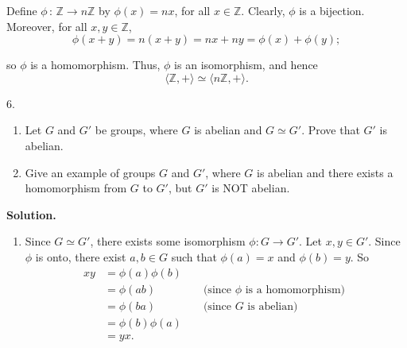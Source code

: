 \documentclass[10pt,]{book}
\theoremstyle{plain}
\theoremstyle{definition}
\theoremstyle{definition}
\theoremstyle{definition}
\theoremstyle{definition}
\numberwithin{equation}{section}
\def\Z{\mathbb{Z}}
\newcommand{\amp}{ & }
\begin{document}
\begin{exerciselist}
      Define \(\phi\,:\,\Z \rightarrow n\Z\)
      by \(\phi(x)=nx\), for all \(x\in \Z\). Clearly, \(\phi\)
      is a bijection. Moreover, for all \(x,y\in \Z\),
\begin{equation*}

        \phi(x+y)=n(x+y)=nx+ny=\phi(x)+\phi(y);
      
\end{equation*}

      so \(\phi\) is a
      homomorphism. Thus, \(\phi\) is an isomorphism, and hence
\begin{equation*}

        \langle \Z, +\rangle \simeq \langle n\Z, +\rangle .
      
\end{equation*}

\item[6.]\hypertarget{exercise-26}{}\leavevmode%
\begin{enumerate}[label=(\alph*)]
\item\hypertarget{li-182}{}
            Let \(G\) and \(G'\) be groups, where \(G\) is abelian and  \(G\simeq G'\). Prove that \(G'\) is abelian.
\item\hypertarget{li-183}{}
            Give an example of groups \(G\) and \(G'\), where \(G\) is abelian and there exists a homomorphism from \(G\) to \(G'\), but \(G'\) is NOT abelian.
\end{enumerate}
\par\smallskip
\par\smallskip
\noindent\textbf{Solution.}\hypertarget{solution-26}{}\quad
\leavevmode%
\begin{enumerate}[label=(\alph*)]
\item\hypertarget{li-184}{}
          Since \(G\simeq G'\), there exists some isomorphism \(\phi:G\to G'\).  Let \(x,y\in G'\).  Since \(\phi\) is onto, there exist \(a,b\in G\) such that \(\phi(a)=x\) and \(\phi(b)=y\).  So
\begin{align*}
xy\amp =\phi(a)\phi(b)\amp \amp\\
\amp =\phi(ab)\amp \amp \text{ (since \(\phi\) is a homomorphism) }\\
\amp =\phi(ba) \amp \amp \text{ (since \(G\) is abelian) }\\
\amp =\phi(b)\phi(a)\\
\amp =yx.
\end{align*}


\end{enumerate}
\end{exerciselist}
\end{document}
